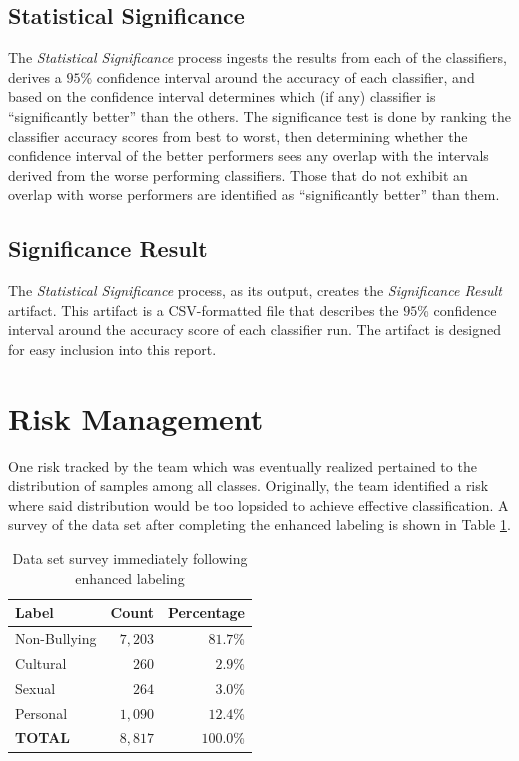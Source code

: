 \documentclass[conference]{sig-alternate-05-2015}
\begin{document}
\subsection{Statistical Significance}\label{subsec:stat_significance}
The \textit{Statistical Significance} process ingests the results from each of the
classifiers, derives a $95$\% confidence interval around the accuracy of each
classifier, and based on the confidence interval determines which (if any)
classifier is ``significantly better'' than the others. The significance test
is done by ranking the classifier accuracy scores from best to worst, then
determining whether the confidence interval of the better performers sees any
overlap with the intervals derived from the worse performing classifiers. Those
that do not exhibit an overlap with worse performers are identified as
``significantly better'' than them.

\subsection{Significance Result}\label{subsec:stat_sig_result}
The \textit{Statistical Significance} process, as its output, creates the
\textit{Significance Result} artifact. This artifact is a CSV-formatted file
that describes the $95$\% confidence interval around the accuracy score of each
classifier run. The artifact is designed for easy inclusion into this report.

\section{Risk Management}\label{sec:expectations}

One risk tracked by the team which was eventually realized pertained to the
distribution of samples among all classes. Originally, the team identified a
risk where said distribution would be too lopsided to achieve effective
classification. A survey of the data set after completing the enhanced labeling
is shown in Table \ref{tab:dataset_survey_first}.

\begin{table}[h!]
  \centering
  \begin{tabular}{| l | r | r |}
    \hline
    Label & Count & Percentage \\
    \hline\hline
    Non-Bullying & $7,203$ & $81.7$\% \\
    \hline
    Cultural & $260$ & $2.9$\% \\
    \hline
    Sexual & $264$ & $3.0$\% \\
    \hline
    Personal & $1,090$ & $12.4$\% \\
    \hline\hline
    \textbf{TOTAL} & $8,817$ & $100.0$\% \\
    \hline
  \end{tabular}
  \caption{Data set survey immediately following enhanced labeling}
  \label{tab:dataset_survey_first}
\end{table}
\end{document}
